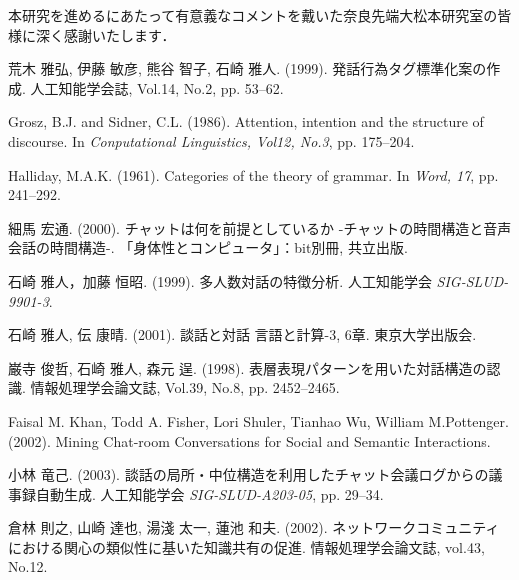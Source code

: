 \acknowledgment

本研究を進めるにあたって有意義なコメントを戴いた奈良先端大松本研究室の皆
様に深く感謝いたします．


\begin{thebibliography}{}

荒木 雅弘, 伊藤 敏彦, 熊谷 智子, 石崎 雅人. (1999). 
\newblock 発話行為タグ標準化案の作成. 
\newblock 人工知能学会誌, Vol.14, No.2, pp. 53--62.

Grosz, B.J. and Sidner, C.L. (1986). 
\newblock Attention, intention and the structure of discourse. 
\newblock In {\em Conputational Linguistics, Vol12, No.3}, pp. 175--204.

Halliday, M.A.K. (1961). 
\newblock Categories of the theory of grammar. 
\newblock In {\em Word, 17}, pp. 241--292. 

細馬 宏通. (2000). 
\newblock チャットは何を前提としているか -チャットの時間構造と音声会話の時間構造-. 
\newblock 「身体性とコンピュータ」：bit別冊, 共立出版.

石崎 雅人，加藤 恒昭. (1999). 
\newblock 多人数対話の特徴分析. 
\newblock 人工知能学会 {\em SIG-SLUD-9901-3}.

石崎 雅人, 伝 康晴. (2001). 
\newblock 談話と対話 言語と計算-3, 6章. 
\newblock 東京大学出版会.

巌寺 俊哲, 石崎 雅人, 森元 逞. (1998). 
\newblock 表層表現パターンを用いた対話構造の認識. 
\newblock 情報処理学会論文誌, Vol.39, No.8, pp. 2452--2465.

Faisal M. Khan, Todd A. Fisher, Lori Shuler, Tianhao Wu, William M.Pottenger. (2002).
\newblock Mining Chat-room Conversations for Social and Semantic Interactions. 

小林 竜己. (2003). 
\newblock 談話の局所・中位構造を利用したチャット会議ログからの議事録自動生成. 
\newblock 人工知能学会 {\em SIG-SLUD-A203-05}, pp. 29--34.

倉林 則之, 山崎 達也, 湯淺 太一, 蓮池 和夫. (2002). 
\newblock ネットワークコミュニティにおける関心の類似性に基いた知識共有の促進. 
\newblock 情報処理学会論文誌, vol.43, No.12.


\end{thebibliography}
